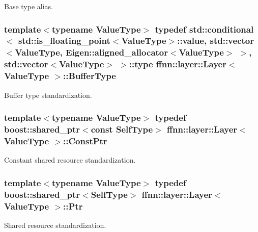 Base type alias. 

\hypertarget{classffnn_1_1layer_1_1_layer_ae755be4e0e146b543c0b46a9b8e0bb01}{
\subsubsection[{Buffer\-Type}]{\setlength{\rightskip}{0pt plus 5cm}template$<$typename Value\-Type$>$ typedef std\-::conditional$<$ std\-::is\-\_\-floating\-\_\-point$<$Value\-Type$>$\-::value, std\-::vector$<$Value\-Type, Eigen\-::aligned\-\_\-allocator$<$Value\-Type$>$ $>$, std\-::vector$<$Value\-Type$>$ $>$\-::type {\bf ffnn\-::layer\-::\-Layer}$<$ Value\-Type $>$\-::{\bf Buffer\-Type}}}\label{classffnn_1_1layer_1_1_layer_ae755be4e0e146b543c0b46a9b8e0bb01}


Buffer type standardization. 

\hypertarget{classffnn_1_1layer_1_1_layer_adc3e5427239b7ce83615364d859ef449}{
\subsubsection[{Const\-Ptr}]{\setlength{\rightskip}{0pt plus 5cm}template$<$typename Value\-Type$>$ typedef boost\-::shared\-\_\-ptr$<$const {\bf Self\-Type}$>$ {\bf ffnn\-::layer\-::\-Layer}$<$ Value\-Type $>$\-::{\bf Const\-Ptr}}}\label{classffnn_1_1layer_1_1_layer_adc3e5427239b7ce83615364d859ef449}


Constant shared resource standardization. 

\hypertarget{classffnn_1_1layer_1_1_layer_ac7c8ad3ab68dbb629077e9ace21871dc}{
\subsubsection[{Ptr}]{\setlength{\rightskip}{0pt plus 5cm}template$<$typename Value\-Type$>$ typedef boost\-::shared\-\_\-ptr$<${\bf Self\-Type}$>$ {\bf ffnn\-::layer\-::\-Layer}$<$ Value\-Type $>$\-::{\bf Ptr}}}\label{classffnn_1_1layer_1_1_layer_ac7c8ad3ab68dbb629077e9ace21871dc}


Shared resource standardization. 

